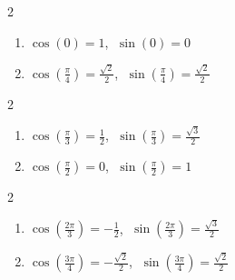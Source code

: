 \documentclass{ximera}
\begin{document}
	\author{Stitz-Zeager}



\begin{multicols}{2}

\begin{enumerate}

\item $\cos(0) = 1$, $\; \sin(0) = 0$ 

\item $\cos \left(\frac{\pi}{4} \right) = \frac{\sqrt{2}}{2}$, $\; \sin \left(\frac{\pi}{4} \right) = \frac{\sqrt{2}}{2}$

\setcounter{HW}{\value{enumi}}

\end{enumerate}

\end{multicols}

\begin{multicols}{2}

\begin{enumerate}

\setcounter{enumi}{\value{HW}}

\item $\cos \left(\frac{\pi}{3}\right) = \frac{1}{2}$, $\; \sin \left(\frac{\pi}{3}\right) = \frac{\sqrt{3}}{2}$

\item $\cos \left(\frac{\pi}{2}\right) = 0$, $\; \sin \left(\frac{\pi}{2}\right) = 1$ 

\setcounter{HW}{\value{enumi}}

\end{enumerate}

\end{multicols}

\begin{multicols}{2}

\begin{enumerate}

\setcounter{enumi}{\value{HW}}

\item $\cos\left(\frac{2\pi}{3}\right) = -\frac{1}{2}$, $\; \sin \left(\frac{2\pi}{3}\right) = \frac{\sqrt{3}}{2}$

\item $\cos \left(\frac{3\pi}{4} \right) = -\frac{\sqrt{2}}{2}$, $\; \sin \left(\frac{3\pi}{4} \right) = \frac{\sqrt{2}}{2}$

\setcounter{HW}{\value{enumi}}

\end{enumerate}

\end{multicols}
\end{document}
